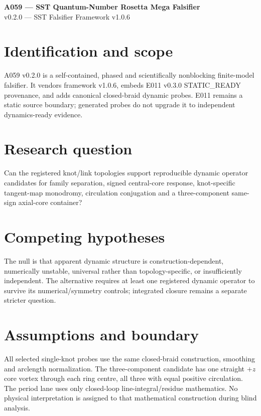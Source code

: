 \documentclass[11pt]{article}
\begin{document}
\begin{center}{\Large\bfseries A059 --- SST Quantum-Number Rosetta Mega Falsifier}\\[3pt]
{\large v0.2.0 --- SST Falsifier Framework v1.0.6}\end{center}

\section{Identification and scope}
A059 v0.2.0 is a self-contained, phased and scientifically nonblocking finite-model falsifier. It vendors framework v1.0.6, embeds E011 v0.3.0 STATIC\_READY provenance, and adds canonical closed-braid dynamic probes. E011 remains a static source boundary; generated probes do not upgrade it to independent dynamics-ready evidence.

\section{Research question}
Can the registered knot/link topologies support reproducible dynamic operator candidates for family separation, signed central-core response, knot-specific tangent-map monodromy, circulation conjugation and a three-component same-sign axial-core container?

\section{Competing hypotheses}
The null is that apparent dynamic structure is construction-dependent, numerically unstable, universal rather than topology-specific, or insufficiently independent. The alternative requires at least one registered dynamic operator to survive its numerical/symmetry controls; integrated closure remains a separate stricter question.

\section{Assumptions and boundary}
All selected single-knot probes use the same closed-braid construction, smoothing and arclength normalization. The three-component candidate has one straight $+z$ core vortex through each ring centre, all three with equal positive circulation. The period lane uses only closed-loop line-integral/residue mathematics. No physical interpretation is assigned to that mathematical construction during blind analysis.
\end{document}

